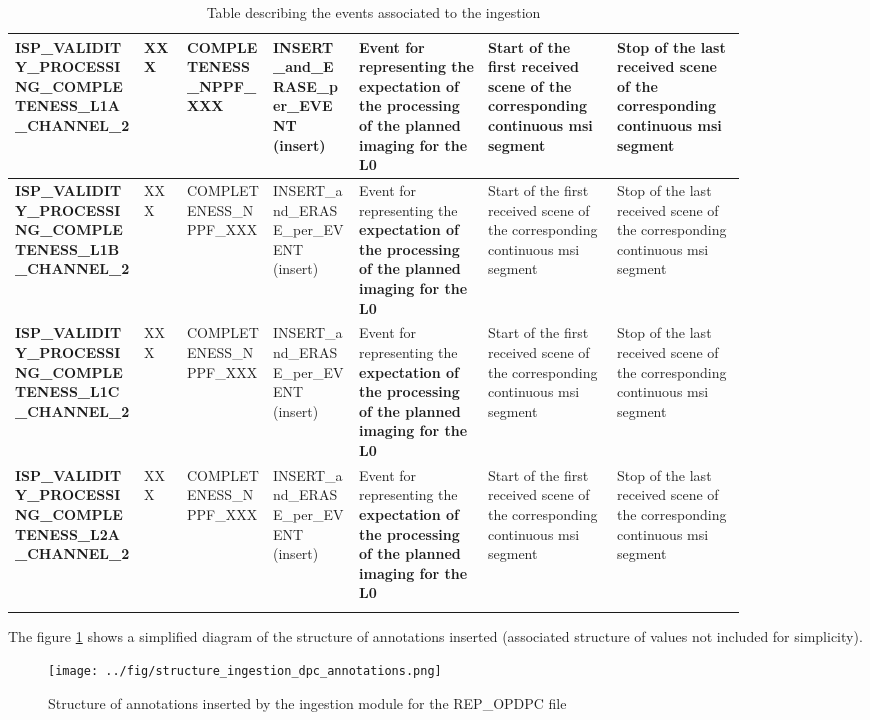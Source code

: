 \begin{landscape}
\begin{longtable}{|M{0.15\linewidth}|M{0.05\linewidth}|M{0.10\linewidth}|M{0.10\linewidth}|M{0.15\linewidth}|M{0.15\linewidth}|M{0.15\linewidth}|}
\textbf{ISP\_VALIDITY\_PROCESSING\_COMPLETENESS\_L1A\_CHANNEL\_2} & XXX & \- COMPLETENESS\_NPPF\_XXX & INSERT\_and\_ERASE\_per\_EVENT (insert) & Event for representing the \textbf{expectation of the processing of the planned imaging for the L0} & Start of the first received scene of the corresponding continuous \acrshort{msi} segment & Stop of the last received scene of the corresponding continuous \acrshort{msi} segment \\ \hline
\textbf{ISP\_VALIDITY\_PROCESSING\_COMPLETENESS\_L1B\_CHANNEL\_2} & XXX & \- COMPLETENESS\_NPPF\_XXX & INSERT\_and\_ERASE\_per\_EVENT (insert) & Event for representing the \textbf{expectation of the processing of the planned imaging for the L0} & Start of the first received scene of the corresponding continuous \acrshort{msi} segment & Stop of the last received scene of the corresponding continuous \acrshort{msi} segment \\ \hline
\textbf{ISP\_VALIDITY\_PROCESSING\_COMPLETENESS\_L1C\_CHANNEL\_2} & XXX & \- COMPLETENESS\_NPPF\_XXX & INSERT\_and\_ERASE\_per\_EVENT (insert) & Event for representing the \textbf{expectation of the processing of the planned imaging for the L0} & Start of the first received scene of the corresponding continuous \acrshort{msi} segment & Stop of the last received scene of the corresponding continuous \acrshort{msi} segment \\ \hline
\textbf{ISP\_VALIDITY\_PROCESSING\_COMPLETENESS\_L2A\_CHANNEL\_2} & XXX & \- COMPLETENESS\_NPPF\_XXX & INSERT\_and\_ERASE\_per\_EVENT (insert) & Event for representing the \textbf{expectation of the processing of the planned imaging for the L0} & Start of the first received scene of the corresponding continuous \acrshort{msi} segment & Stop of the last received scene of the corresponding continuous \acrshort{msi} segment \\ \hline
\caption{Table describing the events associated to the ingestion}
\label{tb:description_events_ingestion_dpc}
\end{longtable}
\end{landscape}

The figure \ref{fg:structure_ingestion_dpc_annotations} shows a simplified diagram of the structure of annotations inserted (associated structure of values not included for simplicity).

\begin{figure}[H]
  \begin{center}
	\centering\texttt{[image: ../fig/structure\_ingestion\_dpc\_annotations.png]}
	\caption{Structure of annotations inserted by the ingestion module for the REP\_OPDPC file}
	\label{fg:structure_ingestion_dpc_annotations}
  \end{center}
\end{figure}
